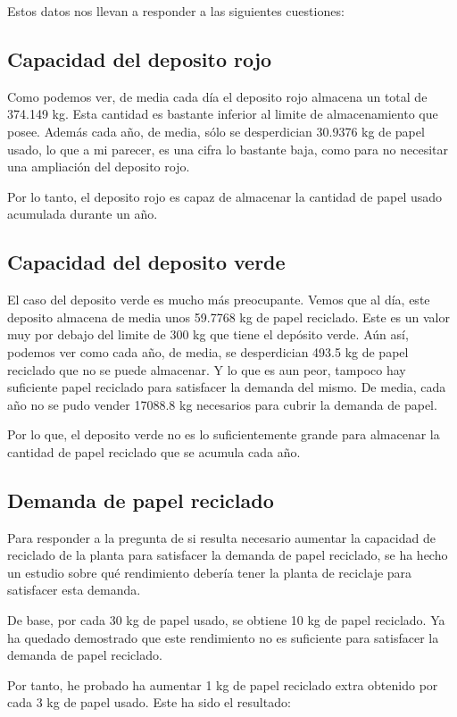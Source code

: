 Estos datos nos llevan a responder a las siguientes cuestiones:

\subsection{Capacidad del deposito rojo}
Como podemos ver, de media cada día el deposito rojo almacena un total de 374.149 kg. Esta cantidad es bastante inferior al limite de almacenamiento que posee. Además cada año, de media, sólo se desperdician 30.9376 kg de papel usado, lo que a mi parecer, es una cifra lo bastante baja, como para no necesitar una ampliación del deposito rojo.

Por lo tanto, el deposito rojo es capaz de almacenar la cantidad de papel usado acumulada durante un año.

\subsection{Capacidad del deposito verde}
El caso del deposito verde es mucho más preocupante. Vemos que al día, este deposito almacena de media unos 59.7768 kg de papel reciclado. Este es un valor muy por debajo del limite de 300 kg que tiene el depósito verde. Aún así, podemos ver como cada año, de media, se desperdician 493.5 kg de papel reciclado que no se puede almacenar.
Y lo que es aun peor, tampoco hay suficiente papel reciclado para satisfacer la demanda del mismo. De media, cada año no se pudo vender 17088.8 kg necesarios para cubrir la demanda de papel.

Por lo que, el deposito verde no es lo suficientemente grande para almacenar la cantidad de papel reciclado que se acumula cada año.

\subsection{Demanda de papel reciclado}

Para responder a la pregunta de si resulta necesario aumentar la capacidad de reciclado de la planta para satisfacer la demanda de papel reciclado, se ha hecho un estudio sobre qué rendimiento debería tener la planta de reciclaje para satisfacer esta demanda.

De base, por cada 30 kg de papel usado, se obtiene 10 kg de papel reciclado. Ya ha quedado demostrado que este rendimiento no es suficiente para satisfacer la demanda de papel reciclado.

Por tanto, he probado ha aumentar 1 kg de papel reciclado extra obtenido por cada 3 kg de papel usado. Este ha sido el resultado:

